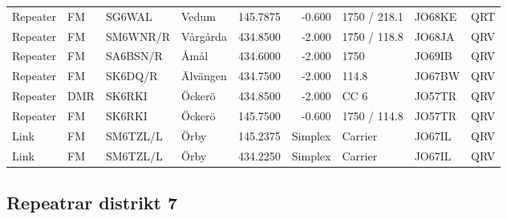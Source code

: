 \begin{landscape}
\begin{longtable}{llllrrlll}
Repeater & FM        & SG6WAL   & Vedum             & 145.7875     & -0.600     & 1750 / 218.1 & JO68KE      & QRT      \\
Repeater & FM        & SM6WNR/R & Vårgårda          & 434.8500     & -2.000     & 1750 / 118.8 & JO68JA      & QRV      \\
Repeater & FM        & SA6BSN/R & Åmål              & 434.6000     & -2.000     & 1750         & JO69IB      & QRV      \\
Repeater & FM        & SK6DQ/R  & Älvängen          & 434.7500     & -2.000     & 114.8        & JO67BW      & QRV      \\
Repeater & DMR       & SK6RKI   & Öckerö            & 434.8500     & -2.000     & CC 6         & JO57TR      & QRV      \\
Repeater & FM        & SK6RKI   & Öckerö            & 145.7500     & -0.600     & 1750 / 114.8 & JO57TR      & QRV      \\
Link     & FM        & SM6TZL/L & Örby              & 145.2375     & Simplex    & Carrier      & JO67IL      & QRV      \\
Link     & FM        & SM6TZL/L & Örby              & 434.2250     & Simplex    & Carrier      & JO67IL      & QRV      \\
\end{longtable}


\clearpage

\subsection{Repeatrar distrikt 7}


\end{landscape}
